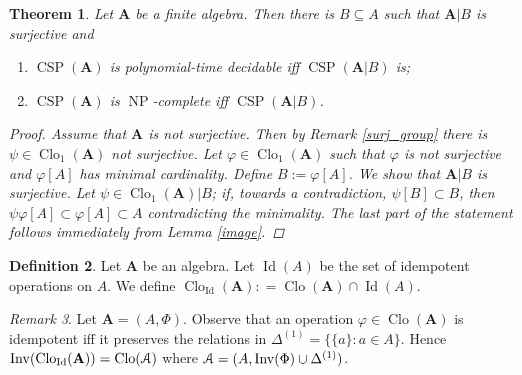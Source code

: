 \documentclass{amsart}
\theoremstyle{plain}
\newtheorem{theorem}{Theorem}[section]
\theoremstyle{definition}
\newtheorem{definition}[theorem]{Definition}
\theoremstyle{remark}
\newtheorem{remark}[theorem]{Remark}
\def\phi{\varphi}
\DeclareMathOperator{\Clo}{Clo}
\DeclareMathOperator{\CSP}{CSP}
\DeclareMathOperator{\Inv}{Inv}
\DeclareMathOperator{\NP}{NP}
\DeclareMathOperator{\Id}{Id}
\begin{document}
\begin{theorem}
    Let $\mathbf{A}$ be a finite algebra. 
    Then there is $B \subseteq A$ such that $\mathbf{A}|B$ is surjective and 
    \begin{enumerate}
        \item $\CSP(\mathbf{A})$ is polynomial-time decidable iff $\CSP(\mathbf{A}|B)$ is; 
        \item $\CSP(\mathbf{A})$ is $\NP$-complete iff $\CSP(\mathbf{A}|B)$.
    \end{enumerate}
    \begin{proof}
        Assume that $\mathbf{A}$ is not surjective. 
        Then by Remark \ref{surj_group} there is $\psi \in \Clo_1(\mathbf{A})$ not surjective. 
        Let $\phi \in \Clo_1(\mathbf{A})$ such that $\phi$ is not surjective and $\phi[A]$ has minimal cardinality. 
        Define $B:=\phi[A]$. 
        We show that $\mathbf{A}|B$ is surjective. 
        Let $\psi \in \Clo_1(\mathbf{A})|B$; if, towards a contradiction, $\psi[B] \subset B$, then $\psi \phi [A] \subset \phi[A] \subset A$ contradicting the minimality. 
        The last part of the statement follows immediately from Lemma \ref{image}. 
    \end{proof}
\end{theorem}


\begin{definition}
    Let $\mathbf{A}$ be an algebra. 
    Let $\Id(A)$ be the set of idempotent operations on $A$. 
    We define $\Clo_{\Id}(\mathbf{A}): = \Clo(\mathbf{A}) \cap \Id(A)$. 
\end{definition}

\begin{remark}
    \label{idempotent}
    Let $\mathbf{A}=(A, \Phi)$. 
    Observe that an operation $\phi \in \Clo(\mathbf{A})$ is idempotent iff it preserves the relations in $\Delta^{(1)}=\{\{a\} : a \in A\}$. 
    Hence $\Inv(\Clo_{\Id}(\mathbf{A})) = \Clo(\EuScript{A})$ where $\EuScript{A}=(A, \Inv(\Phi) \cup \Delta^{(1)})$. 
\end{remark}
\end{document}
